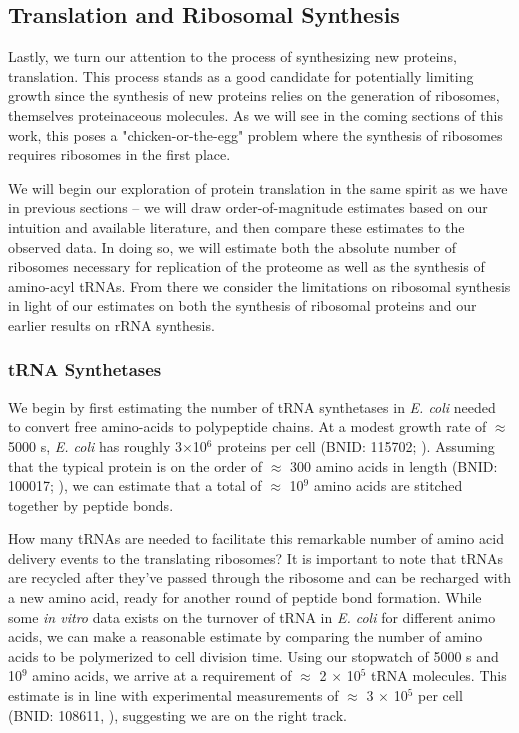 \subsection{Translation and Ribosomal Synthesis}
Lastly, we turn our attention to the process of synthesizing new proteins,
translation. This process stands as a good candidate for potentially limiting growth
since the synthesis of new proteins relies on the generation of ribosomes,
themselves proteinaceous molecules. As we will see in the coming sections of
this work, this poses a "chicken-or-the-egg" problem where the synthesis of
ribosomes requires ribosomes in the first place.

We will begin our exploration of protein translation in the same spirit as we
have in previous sections -- we will draw order-of-magnitude estimates based on
our intuition and available literature, and then compare these estimates
to the observed data. In doing so, we will estimate both the absolute number of
ribosomes necessary for replication of the proteome as well as the synthesis of
amino-acyl tRNAs. From there we consider the limitations on ribosomal synthesis in
light of our estimates on both the synthesis of ribosomal proteins and
our earlier results on rRNA synthesis.

\subsubsection{tRNA Synthetases}
We begin by first estimating the number of tRNA synthetases in \textit{E. coli}
needed to convert free amino-acids to polypeptide chains. At a modest growth
rate of $\approx$ 5000 s, \textit{E. coli} has roughly 3$\times$10$^6$ proteins
per cell (BNID: 115702; \cite{milo2010}). Assuming that the typical protein is
on the order of $\approx$ 300 amino acids in length (BNID: 100017;
\cite{milo2010}), we can estimate that a total of $\approx$ 10$^9$ amino acids
are stitched together by peptide bonds.

How many tRNAs are needed to facilitate this remarkable number of amino acid
delivery events to the translating ribosomes? It is important to note that tRNAs
are recycled after they've passed through the ribosome and can be recharged with
a new amino acid, ready for another round of peptide bond formation. While some
\textit{in vitro} data exists on  the turnover of tRNA in \textit{E. coli} for
different  animo acids, we can make a reasonable estimate by comparing the
number of amino acids to be  polymerized to cell division time. Using our
stopwatch of 5000 s and 10$^9$ amino acids, we arrive at a requirement of
$\approx$ 2 $\times$ 10$^5$ tRNA molecules. This estimate is in line with
experimental measurements of $\approx$ 3 $\times$ 10$^5$ per cell (BNID: 108611,
\cite{milo2010}), suggesting we are on the right track.


